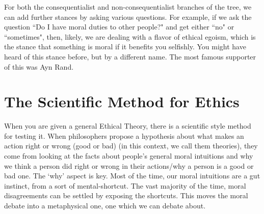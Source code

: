 For both the consequentialist and non-consequentialist branches of the tree, we can add further stances by asking various questions. For example, if we ask the question ``Do I have moral duties to other people?" and get either ``no" or ``sometimes", then, likely, we are dealing with a flavor of ethical egoism, which is the stance that something is moral if it benefits you selfishly. You might have heard of this stance before, but by a different name. The most famous supporter of this was Ayn Rand.

\section{The Scientific Method for Ethics}

When you are given a general Ethical Theory, there is a scientific style method for testing it. When philosophers propose a hypothesis about what makes an action right or wrong (good or bad) (in this context, we call them theories), they come from looking at the facts about people’s general moral intuitions and why we think a person did right or wrong in their actions/why a person is a good or bad one.  The ‘why’ aspect is key. Most of the time, our moral intuitions are a gut instinct, from a sort of mental-shortcut. The vast majority of the time, moral disagreements can be settled by exposing the shortcuts. This moves the moral debate into a metaphysical one, one which we can debate about. 

